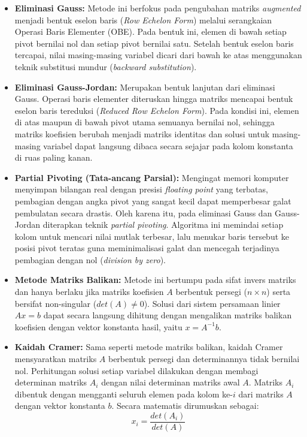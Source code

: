 \documentclass[12pt, a4paper]{article}
\begin{document}
\begin{itemize}
    \item \textbf{Eliminasi Gauss:} Metode ini berfokus pada pengubahan matriks \textit{augmented} menjadi bentuk eselon baris (\textit{Row Echelon Form}) melalui serangkaian Operasi Baris Elementer (OBE). Pada bentuk ini, elemen di bawah setiap pivot bernilai nol dan setiap pivot bernilai satu. Setelah bentuk eselon baris tercapai, nilai masing-masing variabel dicari dari bawah ke atas menggunakan teknik substitusi mundur (\textit{backward substitution}).
    \item \textbf{Eliminasi Gauss-Jordan:} Merupakan bentuk lanjutan dari eliminasi Gauss. Operasi baris elementer diteruskan hingga matriks mencapai bentuk eselon baris tereduksi (\textit{Reduced Row Echelon Form}). Pada kondisi ini, elemen di atas maupun di bawah pivot utama semuanya bernilai nol, sehingga matriks koefisien berubah menjadi matriks identitas dan solusi untuk masing-masing variabel dapat langsung dibaca secara sejajar pada kolom konstanta di ruas paling kanan.
    \item \textbf{Partial Pivoting (Tata-ancang Parsial):} Mengingat memori komputer menyimpan bilangan real dengan presisi \textit{floating point} yang terbatas, pembagian dengan angka pivot yang sangat kecil dapat memperbesar galat pembulatan secara drastis. Oleh karena itu, pada eliminasi Gauss dan Gauss-Jordan diterapkan teknik \textit{partial pivoting}. Algoritma ini memindai setiap kolom untuk mencari nilai mutlak terbesar, lalu menukar baris tersebut ke posisi pivot teratas guna meminimalisasi galat dan mencegah terjadinya pembagian dengan nol (\textit{division by zero}).
    \item \textbf{Metode Matriks Balikan:} Metode ini bertumpu pada sifat invers matriks dan hanya berlaku jika matriks koefisien $A$ berbentuk persegi ($n \times n$) serta bersifat non-singular ($det(A) \neq 0$). Solusi dari sistem persamaan linier $Ax = b$ dapat secara langsung dihitung dengan mengalikan matriks balikan koefisien dengan vektor konstanta hasil, yaitu $x = A^{-1}b$.
    \item \textbf{Kaidah Cramer:} Sama seperti metode matriks balikan, kaidah Cramer mensyaratkan matriks $A$ berbentuk persegi dan determinannya tidak bernilai nol. Perhitungan solusi setiap variabel dilakukan dengan membagi determinan matriks $A_i$ dengan nilai determinan matriks awal $A$. Matriks $A_i$ dibentuk dengan mengganti seluruh elemen pada kolom ke-$i$ dari matriks $A$ dengan vektor konstanta $b$. Secara matematis dirumuskan sebagai:
    $$x_i = \frac{det(A_i)}{det(A)}$$
\end{itemize}
\end{document}
